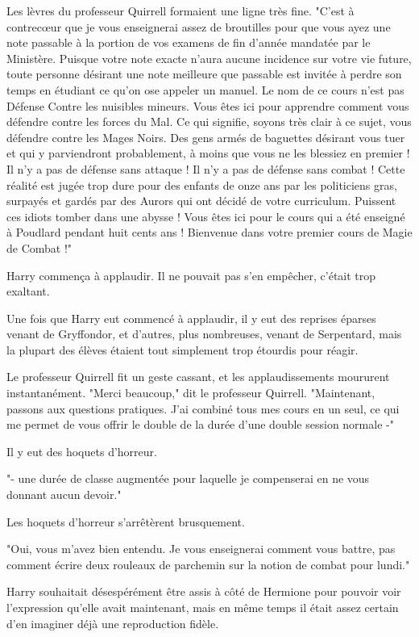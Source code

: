 Les lèvres du professeur Quirrell formaient une ligne très fine. "C'est à contrecœur que je vous enseignerai assez de broutilles pour que vous ayez une note passable à la portion de vos examens de fin d'année mandatée par le Ministère. Puisque votre note exacte n'aura aucune incidence sur votre vie future, toute personne désirant une note meilleure que passable est invitée à perdre son temps en étudiant ce qu'on ose appeler un manuel. Le nom de ce cours n'est pas Défense Contre les nuisibles mineurs. Vous êtes ici pour apprendre comment vous défendre contre les forces du Mal. Ce qui signifie, soyons très clair à ce sujet, vous défendre contre les Mages Noirs. Des gens armés de baguettes désirant vous tuer et qui y parviendront probablement, à moins que vous ne les blessiez en premier ! Il n'y a pas de défense sans attaque ! Il n'y a pas de défense sans combat ! Cette réalité est jugée trop dure pour des enfants de onze ans par les politiciens gras, surpayés et gardés par des Aurors qui ont décidé de votre curriculum. Puissent ces idiots tomber dans une abysse ! Vous êtes ici pour le cours qui a été enseigné à Poudlard pendant huit cents ans ! Bienvenue dans votre premier cours de Magie de Combat !"

Harry commença à applaudir. Il ne pouvait pas s'en empêcher, c'était trop exaltant.

Une fois que Harry eut commencé à applaudir, il y eut des reprises éparses venant de Gryffondor, et d'autres, plus nombreuses, venant de Serpentard, mais la plupart des élèves étaient tout simplement trop étourdis pour réagir.

Le professeur Quirrell fit un geste cassant, et les applaudissements moururent instantanément. "Merci beaucoup," dit le professeur Quirrell. "Maintenant, passons aux questions pratiques. J'ai combiné tous mes cours en un seul, ce qui me permet de vous offrir le double de la durée d'une double session normale -"

Il y eut des hoquets d'horreur.

"- une durée de classe augmentée pour laquelle je compenserai en ne vous donnant aucun devoir."

Les hoquets d'horreur s'arrêtèrent brusquement.

"Oui, vous m'avez bien entendu. Je vous enseignerai comment vous battre, pas comment écrire deux rouleaux de parchemin sur la notion de combat pour lundi."

Harry souhaitait désespérément être assis à côté de Hermione pour pouvoir voir l'expression qu'elle avait maintenant, mais en même temps il était assez certain d'en imaginer déjà une reproduction fidèle.

